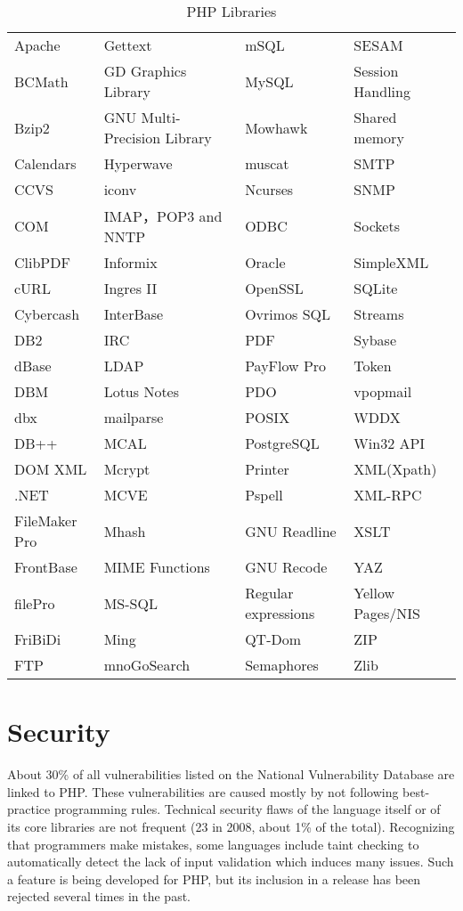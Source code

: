\begin{table}
\centering
\caption{PHP Libraries}
\label{php_libraries}
\begin{tabular}{m{65pt}m{135pt}m{90pt}m{80pt}}
Apache			&Gettext						&mSQL			&SESAM\\
BCMath			&GD Graphics Library			&MySQL		&Session Handling\\
Bzip2			&GNU Multi-Precision Library	&Mowhawk		&Shared memory\\
Calendars		&Hyperwave					&muscat		&SMTP\\
CCVS			&iconv							&Ncurses		&SNMP\\
COM			&IMAP，POP3 and NNTP		&ODBC			&Sockets\\
ClibPDF			&Informix						&Oracle		&SimpleXML\\
cURL			&Ingres II						&OpenSSL		&SQLite\\
Cybercash		&InterBase						&Ovrimos SQL	&Streams\\
DB2			&IRC							&PDF			&Sybase\\
dBase			&LDAP							&PayFlow Pro	&Token\\
DBM			&Lotus Notes					&PDO			&vpopmail\\
dbx				&mailparse						&POSIX			&WDDX\\
DB++			& MCAL							&PostgreSQL	&Win32 API\\
DOM XML		&Mcrypt						&Printer		&XML(Xpath)\\
.NET			&MCVE							&Pspell			&XML-RPC\\
FileMaker Pro	&Mhash							&GNU Readline	&XSLT\\
FrontBase		&MIME Functions				&GNU Recode	&YAZ\\
filePro			& MS-SQL						&Regular expressions&Yellow Pages/NIS\\
FriBiDi			&Ming							&QT-Dom		&ZIP\\
FTP				&mnoGoSearch					&Semaphores	&Zlib\\


\end{tabular}
\end{table}




\chapter{Security}


About 30\% of all vulnerabilities listed on the National Vulnerability Database are linked to PHP. These vulnerabilities are caused mostly by not following best-practice programming rules. Technical security flaws of the language itself or of its core libraries are not frequent (23 in 2008, about 1\% of the total). Recognizing that programmers make mistakes, some languages include taint checking to automatically detect the lack of input validation which induces many issues. Such a feature is being developed for PHP, but its inclusion in a release has been rejected several times in the past.

